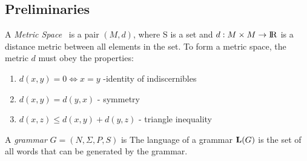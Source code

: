 \subsection{Preliminaries}
A \textit{Metric Space}~\cite{textbook} is a pair $(M,d)$, where S is a set and $d:M \times M \to {\rm I\!R}$ is a distance metric between all elements in the set. 
To form a metric space, the metric $d$ must obey the properties:

\begin{enumerate}
  \item $d(x,y) = 0 \Leftrightarrow x = y$ -identity of indiscernibles
  \item $d(x,y)  = d(y,x)$ - symmetry
  \item $d(x,z) \le d(x,y) + d(y, z)$ - triangle inequality
\end{enumerate}

A \textit{grammar} $G = (N,\Sigma,P,S)$ is 
The language of a grammar $\mathbf{L}(G)$ is the set of all words that can be generated by the grammar.

